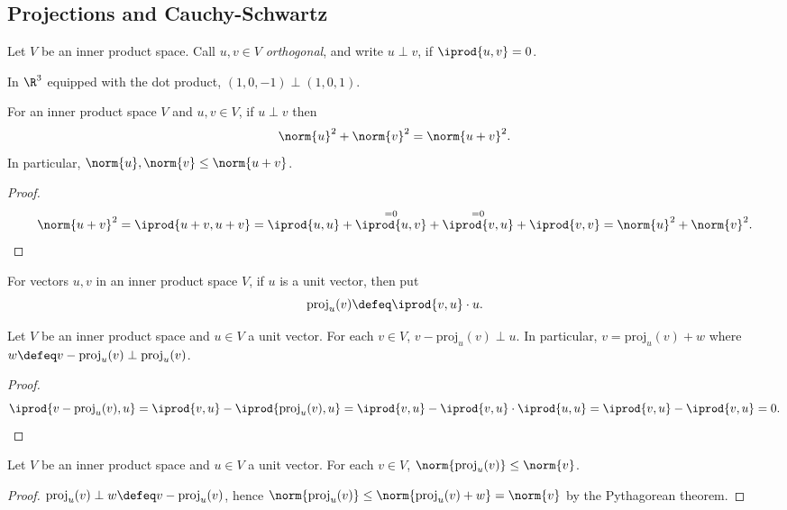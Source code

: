 \subsection{Projections and Cauchy-Schwartz}

\begin{definition}[Orthogonal]
    Let $V$ be an inner product space. Call $u, v \in V$ \emph{orthogonal}, and write $u \perp v$, if $\iprod{u,v} = 0$.
\end{definition}
\begin{example}
    In $\R^3$ equipped with the dot product, $(1, 0, -1) \perp (1, 0, 1)$.
\end{example}

\begin{theorem}
    For an inner product space $V$ and $u, v \in V$, if $u \perp v$ then \[
    \norm{u}^2 + \norm{v}^2 = \norm{u + v}^2.    
    \]
    In particular, $\norm{u}, \norm{v} \leq \norm{u + v}$.
\end{theorem}
\begin{proof}
    \[
    \norm{u + v}^2 = \iprod{u + v, u + v} = \iprod{u, u} + \overset{=0}{\iprod{u, v}} + \overset{=0}{\iprod{v, u}} + \iprod{v, v} = \norm{u}^2 + \norm{v}^2.
    \]
\end{proof}
\newcommand{\proj}{\text{proj}}
\begin{definition}
    For vectors $u, v$ in an inner product space $V$, if $u$ is a unit vector, then put \[
    \proj_u(v) \defeq \iprod{v, u}\cdot u.     
    \]
\end{definition}

\begin{proposition}
    Let $V$ be an inner product space and $u \in V$ a unit vector. For each $v \in V$, $v - \proj_u(v) \perp u$. In particular, $v = \proj_u(v) + w$ where $w \defeq v - \proj_u(v) \perp \proj_u(v)$.
\end{proposition}

\begin{proof}
    \[
    \iprod{v - \proj_u(v), u} = \iprod{v, u} - \iprod{\proj_u(v), u} = \iprod{v, u} - \iprod{v, u} \cdot \iprod{u, u}     = \iprod{v, u} - \iprod{v, u} = 0.
    \]
\end{proof}
\begin{corollary}
    Let $V$ be an inner product space and $u \in V$ a unit vector. For each $v \in V$, $\norm{\proj_u(v)} \leq \norm{v}$.
\end{corollary}

\begin{proof}
    $\proj_u(v) \perp w \defeq v - \proj_u(v)$, hence $\norm{\proj_u(v)} \leq \norm{\proj_u(v) + w} = \norm{v}$ by the Pythagorean theorem.
\end{proof}

